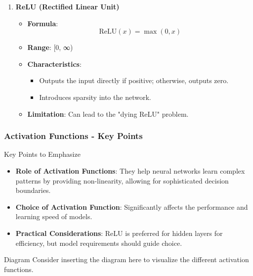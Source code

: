 \documentclass[aspectratio=169]{beamer}
\begin{document}
\begin{frame}[fragile]
\begin{enumerate}
        \item \textbf{ReLU (Rectified Linear Unit)}
            \begin{itemize}
                \item \textbf{Formula}: 
                \[
                \text{ReLU}(x) = \max(0, x)
                \]
                \item \textbf{Range}: [0, ∞)
                \item \textbf{Characteristics}: 
                \begin{itemize}
                    \item Outputs the input directly if positive; otherwise, outputs zero.
                    \item Introduces sparsity into the network.
                \end{itemize}
                \item \textbf{Limitation}: Can lead to the "dying ReLU" problem.
            \end{itemize}
    \end{enumerate}
\end{frame}

\begin{frame}[fragile]
    \frametitle{Activation Functions - Key Points}
    \begin{block}{Key Points to Emphasize}
        \begin{itemize}
            \item \textbf{Role of Activation Functions}: They help neural networks learn complex patterns by providing non-linearity, allowing for sophisticated decision boundaries.
            \item \textbf{Choice of Activation Function}: Significantly affects the performance and learning speed of models.
            \item \textbf{Practical Considerations}: ReLU is preferred for hidden layers for efficiency, but model requirements should guide choice.
        \end{itemize}
    \end{block}
    
    \begin{block}{Diagram}
        Consider inserting the diagram here to visualize the different activation functions.
    \end{block}
\end{frame}
\end{document}
